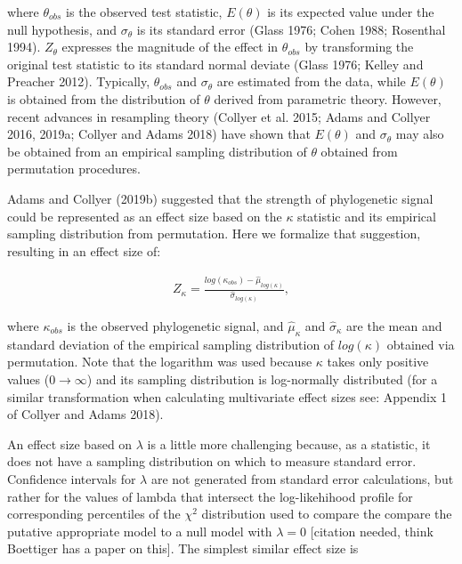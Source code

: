 \documentclass[]{article}
\begin{document}
where \(\theta_{obs}\) is the observed test statistic, \(E(\theta)\) is
its expected value under the null hypothesis, and \(\sigma_\theta\) is
its standard error (Glass 1976; Cohen 1988; Rosenthal 1994).
\(Z_{\theta}\) expresses the magnitude of the effect in \(\theta_{obs}\)
by transforming the original test statistic to its standard normal
deviate (Glass 1976; Kelley and Preacher 2012). Typically,
\(\theta_{obs}\) and \(\sigma_\theta\) are estimated from the data,
while \(E(\theta)\) is obtained from the distribution of \(\theta\)
derived from parametric theory. However, recent advances in resampling
theory (Collyer et al. 2015; Adams and Collyer 2016, 2019a; Collyer and
Adams 2018) have shown that \(E(\theta)\) and \(\sigma_\theta\) may also
be obtained from an empirical sampling distribution of \(\theta\)
obtained from permutation procedures. \hfill\break

Adams and Collyer (2019b) suggested that the strength of phylogenetic
signal could be represented as an effect size based on the \(\kappa\)
statistic and its empirical sampling distribution from permutation. Here
we formalize that suggestion, resulting in an effect size of:

\begin{align}
    Z_\kappa=\frac{log(\kappa_{obs})-\hat\mu_{log(\kappa)}}{\hat\sigma_{log(\kappa)}},
\end{align}

where \(\kappa_{obs}\) is the observed phylogenetic signal, and
\(\hat\mu_\kappa\) and \(\hat\sigma_\kappa\) are the mean and standard
deviation of the empirical sampling distribution of \(log(\kappa)\)
obtained via permutation. Note that the logarithm was used because
\(\kappa\) takes only positive values (\(0\to\infty\)) and its sampling
distribution is log-normally distributed (for a similar transformation
when calculating multivariate effect sizes see: Appendix 1 of Collyer
and Adams 2018). \hfill\break

An effect size based on \(\lambda\) is a little more challenging
because, as a statistic, it does not have a sampling distribution on
which to measure standard error. Confidence intervals for \(\lambda\)
are not generated from standard error calculations, but rather for the
values of lambda that intersect the log-likehihood profile for
corresponding percentiles of the \(\chi^2\) distribution used to compare
the compare the putative appropriate model to a null model with
\(\lambda = 0\) {[}citation needed, think Boettiger has a paper on
this{]}. The simplest similar effect size is
\end{document}
